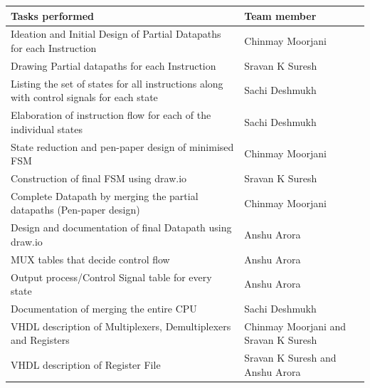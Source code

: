 \documentclass{article}
\begin{document}
\begin{table}[htb]
\centering
\begin{tabularx}{\textwidth}{|>{\centering\arraybackslash}X|>{\centering\arraybackslash}p{4cm}|}
\hline
\textbf{Tasks performed} & \textbf{Team member} \\ \hline
Ideation and Initial Design of Partial Datapaths for each Instruction                      & Chinmay Moorjani                     \\ \hline
Drawing Partial datapaths for each Instruction                                             & Sravan K Suresh                      \\ \hline
Listing the set of states for all instructions along with control signals for each state & Sachi Deshmukh                       \\ \hline
Elaboration of instruction flow for each of the individual states                          & Sachi Deshmukh                       \\ \hline
State reduction and pen-paper design of minimised FSM                                      & Chinmay Moorjani                     \\ \hline
Construction of final FSM using draw.io                                                    & Sravan K Suresh                      \\ \hline
Complete Datapath by merging the partial datapaths (Pen-paper design)                      & Chinmay Moorjani                     \\ \hline
Design and documentation of final Datapath using draw.io                                   & Anshu Arora                          \\ \hline
MUX tables that decide control flow                                                        & Anshu Arora                          \\ \hline
Output process/Control Signal table for every state                                        & Anshu Arora                          \\ \hline
Documentation of merging the entire CPU                                                    & Sachi Deshmukh                       \\ \hline
VHDL description of Multiplexers, Demultiplexers and Registers                             & Chinmay Moorjani and Sravan K Suresh \\ \hline
VHDL description of Register File                                                          & Sravan K Suresh and Anshu Arora      \\ \hline

\end{tabularx}
\end{table}
\end{document}
